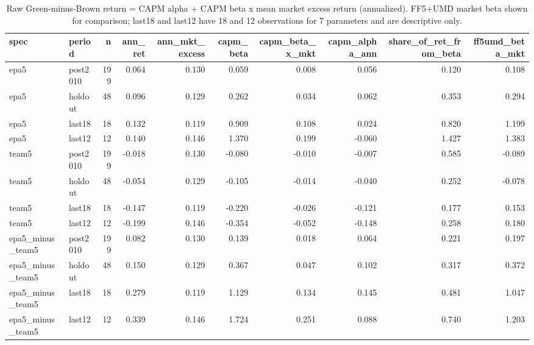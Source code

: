 \begin{table}
\caption{Raw Green-minus-Brown return = CAPM alpha + CAPM beta x mean market excess return (annualized). FF5+UMD market beta shown for comparison; last18 and last12 have 18 and 12 observations for 7 parameters and are descriptive only.}
\label{tab:m4_recent_beta}
\begin{tabular}{llrrrrrrrr}
\toprule
spec & period & n & ann\_ret & ann\_mkt\_excess & capm\_beta & capm\_beta\_x\_mkt & capm\_alpha\_ann & share\_of\_ret\_from\_beta & ff5umd\_beta\_mkt \\
\midrule
epa5 & post2010 & 199 & 0.064 & 0.130 & 0.059 & 0.008 & 0.056 & 0.120 & 0.108 \\
epa5 & holdout & 48 & 0.096 & 0.129 & 0.262 & 0.034 & 0.062 & 0.353 & 0.294 \\
epa5 & last18 & 18 & 0.132 & 0.119 & 0.909 & 0.108 & 0.024 & 0.820 & 1.199 \\
epa5 & last12 & 12 & 0.140 & 0.146 & 1.370 & 0.199 & -0.060 & 1.427 & 1.383 \\
team5 & post2010 & 199 & -0.018 & 0.130 & -0.080 & -0.010 & -0.007 & 0.585 & -0.089 \\
team5 & holdout & 48 & -0.054 & 0.129 & -0.105 & -0.014 & -0.040 & 0.252 & -0.078 \\
team5 & last18 & 18 & -0.147 & 0.119 & -0.220 & -0.026 & -0.121 & 0.177 & 0.153 \\
team5 & last12 & 12 & -0.199 & 0.146 & -0.354 & -0.052 & -0.148 & 0.258 & 0.180 \\
epa5\_minus\_team5 & post2010 & 199 & 0.082 & 0.130 & 0.139 & 0.018 & 0.064 & 0.221 & 0.197 \\
epa5\_minus\_team5 & holdout & 48 & 0.150 & 0.129 & 0.367 & 0.047 & 0.102 & 0.317 & 0.372 \\
epa5\_minus\_team5 & last18 & 18 & 0.279 & 0.119 & 1.129 & 0.134 & 0.145 & 0.481 & 1.047 \\
epa5\_minus\_team5 & last12 & 12 & 0.339 & 0.146 & 1.724 & 0.251 & 0.088 & 0.740 & 1.203 \\
\bottomrule
\end{tabular}
\end{table}
